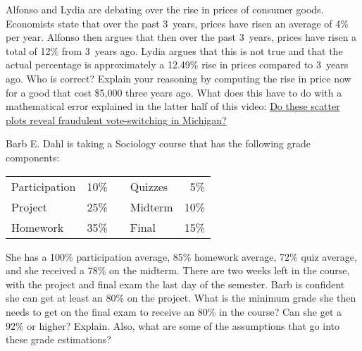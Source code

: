 \documentclass[11pt,letterpaper]{article}
\begin{document}


 Alfonso and Lydia are debating over the rise in prices of consumer goods. Economists state that over the past 3~years, prices have risen an average of 4\% per year. Alfonso then argues that then over the past 3~years, prices have risen a total of 12\% from 3~years ago. Lydia argues that this is not true and that the actual percentage is approximately a 12.49\% rise in prices compared to 3~years ago. Who is correct? Explain your reasoning by computing the rise in price now for a good that cost \$5,000 three years ago. What does this have to do with a mathematical error explained in the latter half of this video: \href{https://www.youtube.com/watch?v=aokNwKx7gM8&ab_channel=Stand-upMaths}{Do these scatter plots reveal fraudulent vote-switching in Michigan?} \pspace



\newpage



 Barb E. Dahl is taking a Sociology course that has the following grade components: \par
	\begin{table}[!ht]
	\centering
	\begin{tabular}{lrclr}
	Participation & 10\% & &  Quizzes & 5\% \\
	Project & 25\% & & Midterm & 10\% \\
	Homework & 35\% & & Final & 15\% \\
	\end{tabular}
	\end{table} \par
She has a 100\% participation average, 85\% homework average, 72\% quiz average, and she received a 78\% on the midterm. There are two weeks left in the course, with the project and final exam the last day of the semester. Barb is confident she can get at least an 80\% on the project. What is the minimum grade she then needs to get on the final exam to receive an 80\% in the course? Can she get a 92\% or higher? Explain. Also, what are some of the assumptions that go into these grade estimations?
\end{document}
